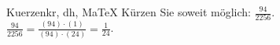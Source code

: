 \begin{MAufgabe}{Kuerzen}{kr, dh, MaTeX}
K\"urzen Sie soweit m\"oglich: $\frac{94}{2256}$.\\ 
\ifLsg\MLoesung
\quad $\frac{94}{2256}=\frac{(94)\cdot(1)}{(94)\cdot(24)}=\frac{1}{24}$.\else\relax\fi
 \end{MAufgabe}